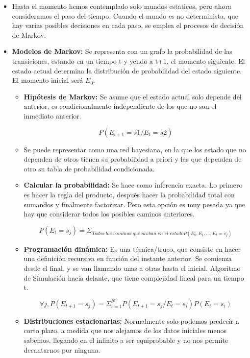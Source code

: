 \documentclass[12pt, twoside, openright]{report} %
\begin{document}
  
  \begin{itemize}
  \item Hasta el momento hemos contemplado solo mundos estaticos, pero ahora
    consideramos el paso del tiempo. Cuando el mundo es no determinista,
    que hay varias posibles decisiones en cada paso, se emplea el
    procesos de decisión de Markov.
    
  \item \textbf{Modelos de Markov:} Se representa con un grafo la
    probabilidad de las transiciones, estando en un tiempo t y yendo a
    t+1, el momento siguiente. El estado actual determina la
    distribución de probabilidad del estado siguiente. El momento
    inicial será $E_0$.
    

    \begin{itemize}
    \item \textbf{Hipótesis de Markov:} Se asume que el estado actual solo
      depende del anterior, es condicionalmente independiente de los que
      no son el inmediato anterior.

	  $$P(E_{t+1}=s1 / E_t =s2)$$
      
    \item Se puede representar como una red bayesiana, en la que los estado
      que no dependen de otros tienen su probabilidad a priori y las que
      dependen de otro su tabla de probabilidad condicionada.
      
    \item \textbf{Calcular la probabilidad:} Se hace como inferencia exacta.
      Lo primero es hacer la regla del producto, después hacer la
      probabilidad total con sumandos y finalmente factorizar. Pero esta
      opción es muy pesada ya que hay que considerar todos los posibles
      caminos anteriores.

	  $$P(E_t = s_j)= \Sigma_{\textit{Todos los caminos que acaban en el estado} P(E_0, E_1, ..., E_t = s_j)}$$
      
    \item \textbf{Programación dinámica:} Es una técnica/truco, que consiste
      en hacer una definición recursiva en función del instante
      anterior. Se comienza desde el final, y se van llamando unas a
      otras hasta el inicial. Algoritmo de Simulación hacia delante, que
      tiene complejidad lineal para un tiempo t.

	  $$\forall j, P(E_{t+1}=s_j) = \Sigma^N_{i=1} P(E_{t+1}=s_j/E_t=s_i)P(E_t = s_i)$$
      
    \item \textbf{Distribuciones estacionarias:} Normalmente solo podemos
      predecir a corto plazo, a medida que nos alejamos de los datos
      iniciales menos sabemos, llegando en el infinito a ser
      equiprobable y no nos permite decantarnos por ninguna.
      


\end{itemize}
\end{itemize}
\end{document}
